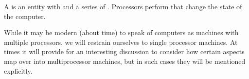 \begin{definition}

A \footnotemark is an entity with  and a series of
.  Processors perform  that change the state of
the computer.


\end{definition}

While it may be modern (about time) to speak of computers as machines with
multiple processors, we will restrain ourselves to single processor machines.
At times it will provide for an interesting discussion to consider how certain
aspects map over into multiprocessor machines, but in such cases they will be
mentioned explicitly.
